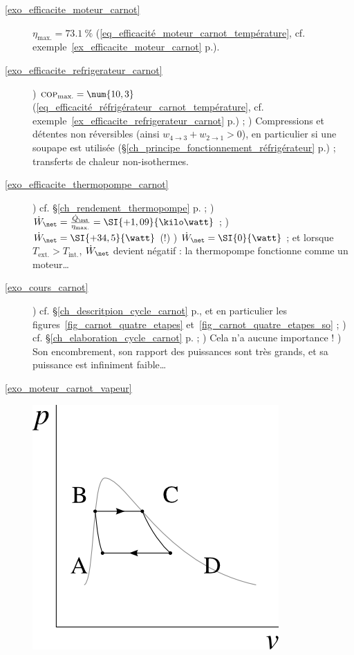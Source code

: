 \exercisesolutionpage
\titreresultats

	\begin{description}
		\item [\ref{exo_efficacite_moteur_carnot}]
					\tab $\eta_\text{max.} = \SI{73,1}{\percent}$ (\ref{eq_efficacité_moteur_carnot_température}, cf. exemple~\ref{ex_efficacite_moteur_carnot} p.\pageref{ex_efficacite_moteur_carnot}).
		\item [\ref{exo_efficacite_refrigerateur_carnot}]
					) $\textsc{cop}_\text{max.} = \num{10,3}$ (\ref{eq_efficacité_réfrigérateur_carnot_température}, cf. exemple~\ref{ex_efficacite_refrigerateur_carnot} p.\pageref{ex_efficacite_refrigerateur_carnot}) ;
					) Compressions et détentes non réversibles (ainsi $w_{4\to 3} + w_{2\to 1} > 0$), en particulier si une soupape est utilisée (\S\ref{ch_principe_fonctionnement_réfrigérateur} p.\pageref{ch_principe_fonctionnement_réfrigérateur}) ; transferts de chaleur non-isothermes.
		\item [\ref{exo_efficacite_thermopompe_carnot}]
					) cf. \S\ref{ch_rendement_thermopompe}	p.\pageref{ch_rendement_thermopompe} ;
					) $\dot W_\net = \frac{\dot Q_\out}{\eta_\text{max.}} = \SI{+1,09}{\kilo\watt}$ ;
					) $\dot W_\net = \SI{+34,5}{\watt}$ (!)
					) $\dot W_\net = \SI{0}{\watt}$ ; et lorsque $T_\text{ext.} > T_\text{int.}$, $\dot W_\net$ devient négatif : la thermopompe fonctionne comme un moteur…
		\item [\ref{exo_cours_carnot}]
					) cf. \S\ref{ch_descritpion_cycle_carnot} p.\pageref{ch_descritpion_cycle_carnot}, et en particulier les figures~\ref{fig_carnot_quatre_etapes} et~\ref{fig_carnot_quatre_etapes_so} ;
					) cf. \S\ref{ch_elaboration_cycle_carnot} p.\pageref{ch_elaboration_cycle_carnot} ;
					) Cela n’a aucune importance !
					) Son encombrement, son rapport des puissances sont très grands, et sa puissance est infiniment faible…
		\item [\ref{exo_moteur_carnot_vapeur}]
					\includegraphics[width=\solutiondiagramwidth]{images/exo_sol_pv_carnot_lv_1.png}

\end{description}
